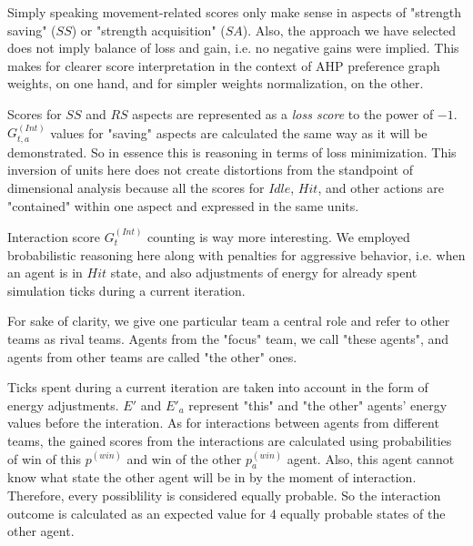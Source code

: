 Simply speaking movement-related scores only make sense in aspects of "strength saving" ($SS$) or "strength acquisition"
($SA$). Also, the approach we have selected does not imply balance of loss and gain, i.e. no negative gains were
implied. This makes for clearer score interpretation in the context of AHP preference graph weights, on one hand, and
for simpler weights normalization, on the other.

Scores for $SS$ and $RS$ aspects are represented as a \textit{loss score} to the power of $-1$. $G_{t,a}^{(Int)}$ values
for "saving" aspects are calculated the same way as it will be demonstrated. So in essence this is reasoning in terms of
loss minimization. This inversion of units here does not create distortions from the standpoint of dimensional analysis
because all the scores for $Idle$, $Hit$, and other actions are "contained" within one aspect and expressed in the same
units.

Interaction score $G_t^{(Int)}$ counting is way more interesting. We employed brobabilistic reasoning here along with
penalties for aggressive behavior, i.e. when an agent is in $Hit$ state, and also adjustments of energy for already
spent simulation ticks during a current iteration.

For sake of clarity, we give one particular team a central role and refer to other teams as rival teams. Agents from the
"focus" team, we call "these agents", and agents from other teams are called "the other" ones.

Ticks spent during a current iteration are taken into account in the form of energy adjustments. $E'$ and $E'_a$
represent "this" and "the other" agents' energy values before the interation. As for interactions between agents from
different teams, the gained scores from the interactions are calculated using probabilities of win of this $p^{(win)}$
and win of the other $p^{(win)}_a$ agent. Also, this agent cannot know what state the other agent will be in by the
moment of interaction. Therefore, every possiblility is considered equally probable. So the interaction outcome is
calculated as an expected value for 4 equally probable states of the other agent.

